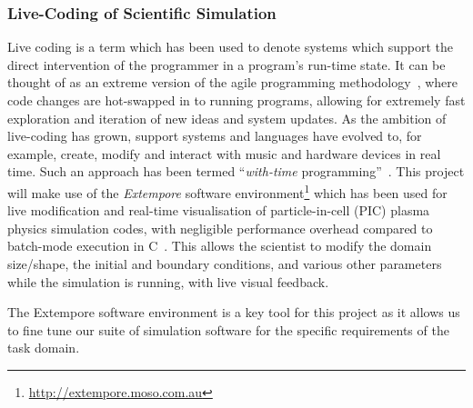 \subsubsection*{Live-Coding of Scientific Simulation}

Live coding is a term which has been used to denote systems which
support the direct intervention of the programmer in a program's
run-time state. It can be thought of as an extreme version of the
agile programming methodology~\parencite{fowlerAgile2001}, where
code changes are hot-swapped in to running programs, allowing for
extremely fast exploration and iteration of new ideas and system
updates. As the ambition of live-coding has grown, support systems and
languages have evolved to, for example, create, modify and interact
with music and hardware devices in real time. Such an approach has
been termed ``\emph{with-time}
programming''~\parencite{sorensen2010programming}. This project will
make use of the \emph{Extempore} software
environment\footnote{\url{http://extempore.moso.com.au}} which has
been used for live modification and real-time visualisation of
particle-in-cell (PIC) plasma physics simulation codes, with
negligible performance overhead compared to batch-mode execution in
C~\parencite{swiftLive2016}. This allows the scientist to modify the
domain size/shape, the initial and boundary conditions, and various
other parameters while the simulation is running, with live visual
feedback.

The Extempore software environment is a key tool for this project as
it allows us to fine tune our suite of simulation software for the
specific requirements of the task domain.


